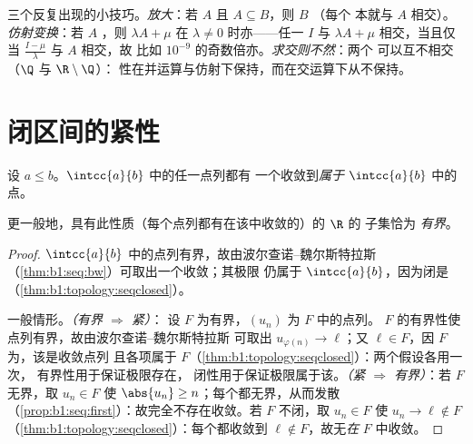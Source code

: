 \begin{example}[稠密性的处理]\label{ex:b1:topology:densitytricks}
三个反复出现的小技巧。\emph{放大}：若
$A$ 且 $A \subseteq B$，则 $B$ （每个
本就与 $A$ 相交）。\emph{仿射变换}：若 $A$
，则 $\lambda A + \mu$ 在 $\lambda \neq 0$ 时亦——任一
 $I$ 与 $\lambda A + \mu$ 相交，当且仅当
$\frac{I - \mu}{\lambda}$ 与 $A$ 相交，故
比如 $10^{-9}$ 的奇数倍亦。\emph{求交则不然}：两个
可以互不相交（$\Q$ 与 $\R \setminus \Q$）：
性在并运算与仿射下保持，而在交运算下从不保持。
\end{example}

\section{闭区间的紧性}

\begin{theorem}[闭区间是列紧的]\label{thm:b1:topology:compact}
设 $a \leq b$。$\intcc{a}{b}$ 中的任一点列都有
一个收敛到\emph{属于}
$\intcc{a}{b}$ 中的点。

更一般地，具有此性质（每个点列都有在该中收敛的）的 $\R$ 的
子集恰为
\emph{有界}。
\end{theorem}

\begin{proof}
$\intcc{a}{b}$ 中的点列有界，故由波尔查诺--魏尔斯特拉斯
（\cref{thm:b1:seq:bw}）可取出一个收敛；其极限
仍属于 $\intcc{a}{b}$，因为闭是
（\cref{thm:b1:topology:seqclosed}）。

一般情形。\emph{（有界 $\Rightarrow$ 紧）}：
设 $F$ 为有界，$(u_n)$ 为 $F$ 中的点列。
$F$ 的有界性使点列有界，故由波尔查诺--魏尔斯特拉斯
可取出 $u_{\varphi(n)} \to \ell$；又 $\ell \in F$，因 $F$
为，该是收敛点列
且各项属于 $F$（\cref{thm:b1:topology:seqclosed}）：两个假设各用一次，
有界性用于保证极限存在，
闭性用于保证极限属于该。\emph{（紧 $\Rightarrow$ 有界）}：若 $F$ 无界，取 $u_n \in F$ 使 $\abs{u_n} \geq
n$；每个都无界，从而发散
（\cref{prop:b1:seq:first}）：故完全不存在收敛。若 $F$
不闭，取 $u_n \in F$ 使 $u_n \to \ell \notin F$
（\cref{thm:b1:topology:seqclosed}）：每个都收敛到
$\ell \notin F$，故无\emph{在} $F$ 中收敛。
\end{proof}

